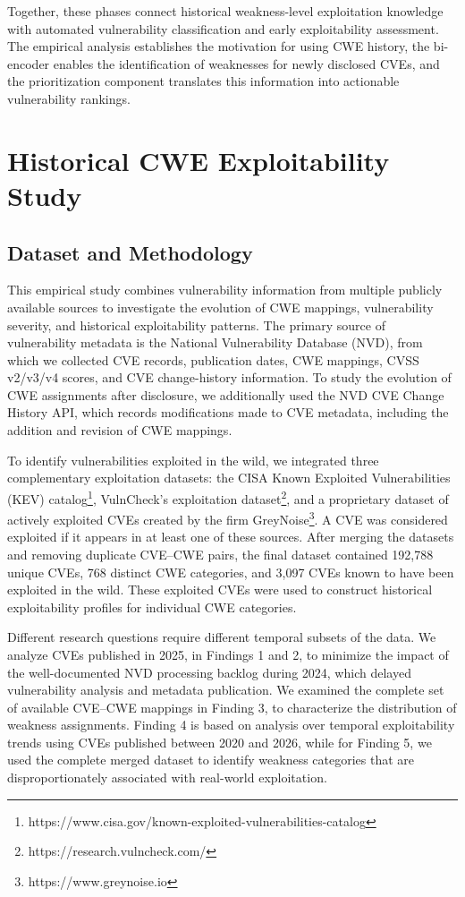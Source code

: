 \documentclass[conference,compsoc]{IEEEtran}
\begin{document}
Together, these phases connect historical
weakness-level exploitation knowledge with automated
vulnerability classification and early exploitability
assessment. The empirical analysis establishes the
motivation for using CWE history, the bi-encoder
enables the identification of weaknesses for newly
disclosed CVEs, and the prioritization component
translates this information into actionable
vulnerability rankings.

\section{Historical CWE Exploitability Study}
\subsection{Dataset and Methodology}
\label{sec:dataset_methodology}

This empirical study combines vulnerability information from multiple publicly available sources to investigate the evolution of CWE mappings, vulnerability severity, and historical exploitability patterns. The primary source of vulnerability metadata is the National Vulnerability Database (NVD), from which we collected CVE records, publication dates, CWE mappings, CVSS v2/v3/v4 scores, and CVE change-history information. To study the evolution of CWE assignments after disclosure, we additionally used the NVD CVE Change History API, which records modifications made to CVE metadata, including the addition and revision of CWE mappings.

To identify vulnerabilities exploited in the wild, we integrated three complementary exploitation datasets: the CISA Known Exploited Vulnerabilities (KEV) catalog\footnote{https://www.cisa.gov/known-exploited-vulnerabilities-catalog}, VulnCheck's exploitation dataset\footnote{https://research.vulncheck.com/}, and  a proprietary dataset of actively exploited CVEs created by the firm GreyNoise\footnote{ https://www.greynoise.io}. A CVE was considered exploited if it appears in at least one of these sources. After merging the datasets and removing duplicate CVE--CWE pairs, the final dataset contained 192,788 unique CVEs, 768 distinct CWE categories, and 3,097 CVEs known to have been exploited in the wild. These exploited CVEs were used to construct historical exploitability profiles for individual CWE categories.

Different research questions require different temporal subsets of the data. We analyze CVEs published in 2025, in Findings 1 and 2, to minimize the impact of the well-documented NVD processing backlog during 2024, which delayed vulnerability analysis and metadata publication. We examined the complete set of available CVE--CWE mappings in Finding 3, to characterize the distribution of weakness assignments. Finding 4 is based on analysis over temporal exploitability trends using CVEs published between 2020 and 2026, while for Finding 5, we used the complete merged dataset to identify weakness categories that are disproportionately associated with real-world exploitation. 
\end{document}
